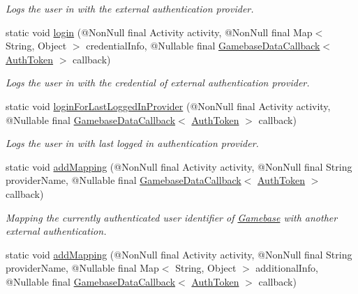 \begin{DoxyCompactItemize}
\begin{DoxyCompactList}\small\item\em Logs the user in with the external authentication provider. \end{DoxyCompactList}\item 
static void \hyperlink{classcom_1_1toast_1_1android_1_1gamebase_1_1_gamebase_aa9ada2b00de7bcc4f96ba8b85319d444}{login} (@Non\+Null final Activity activity, @Non\+Null final Map$<$ String, Object $>$ credential\+Info, @Nullable final \hyperlink{interfacecom_1_1toast_1_1android_1_1gamebase_1_1_gamebase_data_callback}{Gamebase\+Data\+Callback}$<$ \hyperlink{classcom_1_1toast_1_1android_1_1gamebase_1_1auth_1_1data_1_1_auth_token}{Auth\+Token} $>$ callback)
\begin{DoxyCompactList}\small\item\em Logs the user in with the credential of external authentication provider. \end{DoxyCompactList}\item 
static void \hyperlink{classcom_1_1toast_1_1android_1_1gamebase_1_1_gamebase_a2ac5681db5c8d63aaf02ec1daa4b2933}{login\+For\+Last\+Logged\+In\+Provider} (@Non\+Null final Activity activity, @Nullable final \hyperlink{interfacecom_1_1toast_1_1android_1_1gamebase_1_1_gamebase_data_callback}{Gamebase\+Data\+Callback}$<$ \hyperlink{classcom_1_1toast_1_1android_1_1gamebase_1_1auth_1_1data_1_1_auth_token}{Auth\+Token} $>$ callback)
\begin{DoxyCompactList}\small\item\em Logs the user in with last logged in authentication provider. \end{DoxyCompactList}\item 
static void \hyperlink{classcom_1_1toast_1_1android_1_1gamebase_1_1_gamebase_ab860dbc75a62b009d67eca25247493f1}{add\+Mapping} (@Non\+Null final Activity activity, @Non\+Null final String provider\+Name, @Nullable final \hyperlink{interfacecom_1_1toast_1_1android_1_1gamebase_1_1_gamebase_data_callback}{Gamebase\+Data\+Callback}$<$ \hyperlink{classcom_1_1toast_1_1android_1_1gamebase_1_1auth_1_1data_1_1_auth_token}{Auth\+Token} $>$ callback)
\begin{DoxyCompactList}\small\item\em Mapping the currently authenticated user identifier of \hyperlink{classcom_1_1toast_1_1android_1_1gamebase_1_1_gamebase}{Gamebase} with another external authentication. \end{DoxyCompactList}\item 
static void \hyperlink{classcom_1_1toast_1_1android_1_1gamebase_1_1_gamebase_af629f12d988dd37b59259eeb63cdbdd0}{add\+Mapping} (@Non\+Null final Activity activity, @Non\+Null final String provider\+Name, @Nullable final Map$<$ String, Object $>$ additional\+Info, @Nullable final \hyperlink{interfacecom_1_1toast_1_1android_1_1gamebase_1_1_gamebase_data_callback}{Gamebase\+Data\+Callback}$<$ \hyperlink{classcom_1_1toast_1_1android_1_1gamebase_1_1auth_1_1data_1_1_auth_token}{Auth\+Token} $>$ callback)

\end{DoxyCompactItemize}
